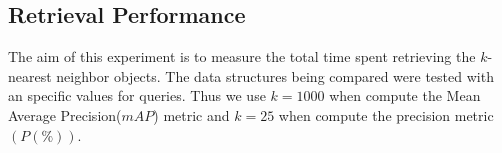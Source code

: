 \documentclass[conference]{IEEEtran}
\begin{document}
 




\subsection{Retrieval Performance} %
 The aim of this experiment is to measure the total time   spent  retrieving the $k$-nearest neighbor objects. The data structures being compared were tested with an specific values for queries. Thus we use   $k=1000$   when compute the Mean Average Precision($mAP$) metric and $k=25$ when compute the  precision metric $(P (\%))$.
\end{document}

